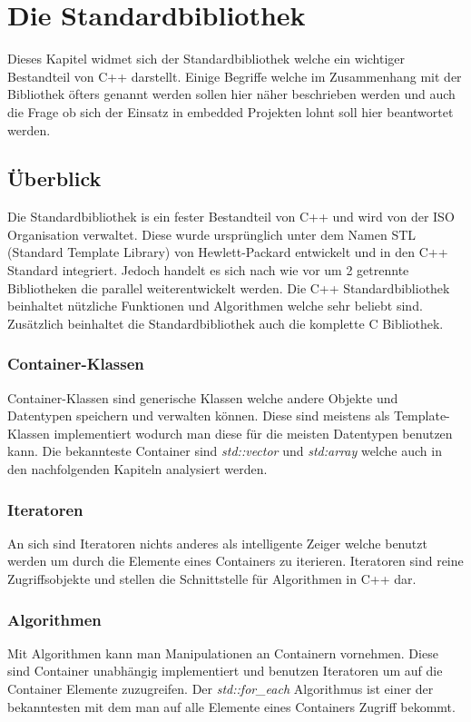 \documentclass[MES,Master,ngerman]{twbook}%
\begin{document}
\section{Die Standardbibliothek}
Dieses Kapitel widmet sich der Standardbibliothek welche ein wichtiger Bestandteil von C++ darstellt. Einige Begriffe welche im Zusammenhang mit der Bibliothek öfters genannt werden sollen hier näher beschrieben werden und auch die Frage ob sich der Einsatz in embedded Projekten lohnt soll hier beantwortet werden.
\subsection{Überblick}
Die Standardbibliothek is ein fester Bestandteil von C++ und wird von der ISO Organisation verwaltet. Diese wurde ursprünglich unter dem Namen STL (Standard Template Library) von Hewlett-Packard entwickelt und in den C++ Standard integriert. Jedoch handelt es sich nach wie vor um 2 getrennte Bibliotheken die parallel weiterentwickelt werden. Die C++ Standardbibliothek beinhaltet nützliche Funktionen und Algorithmen welche sehr beliebt sind. Zusätzlich beinhaltet die Standardbibliothek auch die komplette C Bibliothek. 

\subsubsection{Container-Klassen}
Container-Klassen sind generische Klassen welche andere Objekte und Datentypen speichern und verwalten können. Diese sind meistens als Template-Klassen implementiert wodurch man diese für die meisten Datentypen benutzen kann. Die bekannteste Container sind \textit{std::vector} und \textit{std:array} welche auch in den nachfolgenden Kapiteln analysiert werden.
\subsubsection{Iteratoren}
An sich sind Iteratoren nichts anderes als intelligente Zeiger welche benutzt werden um durch die Elemente eines Containers zu iterieren. Iteratoren sind reine Zugriffsobjekte und stellen die Schnittstelle für Algorithmen in C++ dar.
\subsubsection{Algorithmen}
Mit Algorithmen kann man Manipulationen an Containern vornehmen. Diese sind Container unabhängig implementiert und benutzen Iteratoren um auf die Container Elemente zuzugreifen. Der \textit{std::for\_each} Algorithmus ist einer der bekanntesten mit dem man auf alle Elemente eines Containers Zugriff bekommt.
\end{document}
